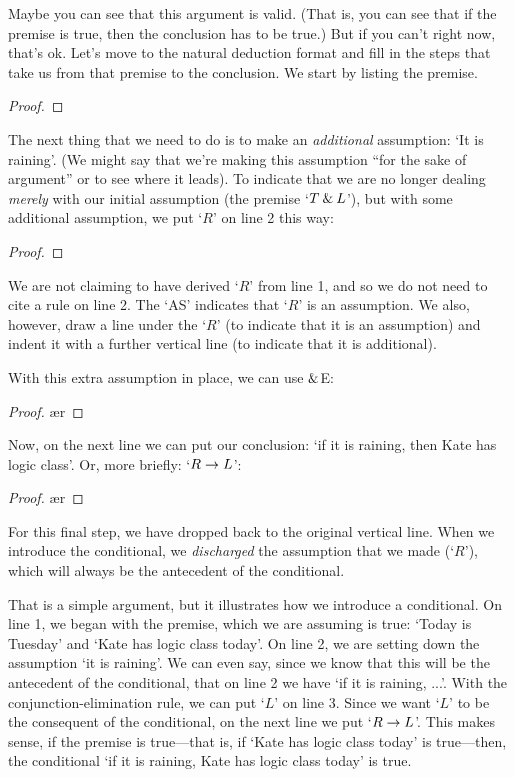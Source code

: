 Maybe you can see that this argument is valid. (That is, you can see that if the premise is true, then the conclusion has to be true.) But if you can't right now, that's ok. Let's move to the natural deduction format and fill in the steps that take us from that premise to the conclusion. We start by listing the premise.
	\begin{proof}
		 
	\end{proof}
The next thing that we need to do is to make an \emph{additional} assumption: `It is raining'. (We might say that we're making this assumption ``for the sake of argument'' or to see where it leads). To indicate that we are no longer dealing \emph{merely} with our initial assumption (the premise `$T \mathbin{\&} L$'), but with some additional assumption, we put `$R$' on line 2 this way:
	\begin{proof}
		 
		\open
			 
	\end{proof}
We are not claiming to have derived `$R$' from line 1, and so we do not need to cite a rule on line 2. The `AS' indicates that `$R$' is an assumption. We also, however, draw a line under the `$R$' (to indicate that it is an assumption) and indent it with a further vertical line (to indicate that it is additional). 

With this extra assumption in place, we can use $\mathbin{\&}$E:
	\begin{proof}
		 
		\open
			 
			\ae{r}
	\end{proof}
Now, on the next line we can put our conclusion: `if it is raining, then Kate has logic class'. Or, more briefly: `$R \rightarrow L$':
	\begin{proof}
		 
		\open
			 
			\ae{r}
			\close
	\end{proof}
For this final step, we have dropped back to the original vertical line. When we introduce the conditional, we \emph{discharged} the assumption that we made (`$R$'), which will always be the antecedent of the conditional. 

That is a simple argument, but it illustrates how we introduce a conditional. On line 1, we began with the premise, which we are assuming is true: `Today is Tuesday' and `Kate has logic class today'. On line 2, we are setting down the assumption `it is raining'. We can even say, since we know that this will be the antecedent of the conditional, that on line 2 we have `if it is raining, ...'. With the conjunction-elimination rule, we can put `$L$' on line 3. Since we want `$L$' to be the consequent of the conditional, on the next line we put `$R \rightarrow L$'. This makes sense, if the premise is true---that is, if `Kate has logic class today' is true---then, the conditional `if it is raining, Kate has logic class today' is true. 

